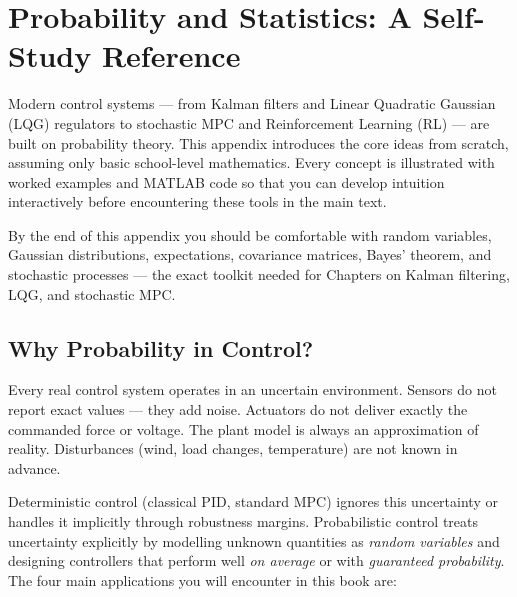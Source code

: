 
\chapter{Probability and Statistics: A Self-Study Reference}
\label{app:prob}

Modern control systems — from Kalman filters and Linear Quadratic
Gaussian (LQG) regulators to stochastic MPC and Reinforcement Learning
(RL) — are built on probability theory.  This appendix introduces the
core ideas from scratch, assuming only basic school-level mathematics.
Every concept is illustrated with worked examples and
MATLAB code so that you can develop intuition interactively before
encountering these tools in the main text.

By the end of this appendix you should be comfortable with random
variables, Gaussian distributions, expectations, covariance matrices,
Bayes' theorem, and stochastic processes — the exact toolkit needed for
Chapters on Kalman filtering, LQG, and stochastic MPC.

\section{Why Probability in Control?}
\label{sec:app_prob_why}

Every real control system operates in an uncertain environment.
Sensors do not report exact values — they add noise.  Actuators do not
deliver exactly the commanded force or voltage.  The plant model is
always an approximation of reality.  Disturbances (wind, load changes,
temperature) are not known in advance.

Deterministic control (classical PID, standard MPC) ignores this
uncertainty or handles it implicitly through robustness margins.
Probabilistic control treats uncertainty explicitly by modelling
unknown quantities as \emph{random variables} and designing controllers
that perform well \emph{on average} or with \emph{guaranteed
probability}.  The four main applications you will encounter in this
book are:

